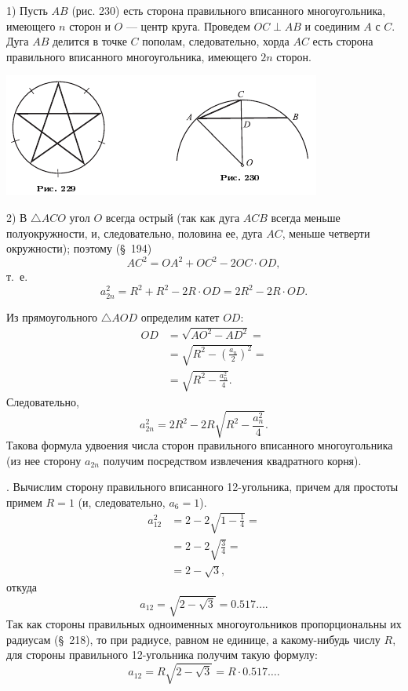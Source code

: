 \documentclass[oneside]{book}
\begin{document}
1) Пусть $AB$ (рис. 230) есть сторона правильного вписанного многоугольника, имеющего $n$ сторон и $O$ — центр круга.
Проведем $OC\perp AB$ и соединим $A$ с $C$.
Дуга $AB$ делится в точке $C$ пополам, следовательно, хорда $AC$ есть сторона правильного вписанного многоугольника, имеющего $2n$ сторон.

\includegraphics{pics/ris-229-230}

2) В $\triangle ACO$ угол $O$ всегда острый (так как дуга $ACB$ всегда меньше полуокружности, и, следовательно, половина ее, дуга $AC$, меньше четверти окружности);
поэтому (§~194)
\[AC^2=OA^2+OC^2-2OC\cdot OD,\]
т.~е.
\[a_{2n}^2=R^2+R^2-2R\cdot OD=2R^2-2R\cdot OD.\]

Из прямоугольного $\triangle AOD$ определим катет $OD$:
\begin{align*}
OD&=\sqrt{AO^2-AD^2}=
\\
&=\sqrt{R^2-(\tfrac{a_n}2)^2}=
\\
&=\sqrt{R^2-\tfrac{a_n^2}4}.
\end{align*}
Следовательно,
\[a_{2n}^2=2R^2-2R\sqrt{R^2-\frac{a_n^2}4}.\]
Такова формула удвоения числа сторон правильного вписанного многоугольника (из нее сторону $a_{2n}$ получим посредством извлечения квадратного корня).

.
Вычислим сторону правильного вписанного 12-угольника, причем для простоты примем $R=1$ (и, следовательно, $a_6 = 1$).
\begin{align*}
a_{12}^2&=2-2\sqrt{1-\tfrac14}=
\\
&=2-2\sqrt{\tfrac34}=
\\
&=2-\sqrt{3},
\end{align*}
откуда
\[a_{12}=\sqrt{2-\sqrt3}=0.517\dots.\]
Так как стороны правильных одноименных многоугольников пропорциональны их радиусам (§~218), то при радиусе, равном не единице, а какому-нибудь числу $R$, для стороны правильного 12-угольника получим такую формулу:
\[a_{12}=R\sqrt{2-\sqrt3}=R\cdot 0.517\dots.\]
\end{document}
